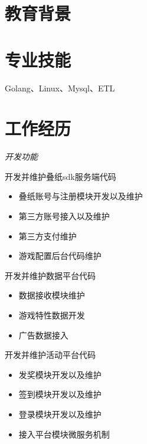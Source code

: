 \documentclass{uniquecv}
\begin{document}

\medskip



\section{教育背景}



\section{专业技能}
\smallskip
Golang、Linux、Mysql、ETL




\section{工作经历}

\textit{开发功能}
\vspace{0.4ex}

开发并维护叠纸sdk服务端代码
\begin{itemize}
  \item 叠纸账号与注册模块开发以及维护
  \item 第三方账号接入以及维护
  \item 第三方支付维护
  \item 游戏配置后台代码维护
\end{itemize}

开发并维护数据平台代码
\begin{itemize}
  \item 数据接收模块维护
  \item 游戏特性数据开发
  \item 广告数据接入
\end{itemize}

开发并维护活动平台代码
\begin{itemize}
  \item 发奖模块开发以及维护
  \item 签到模块开发以及维护
  \item 登录模块开发以及维护
  \item 接入平台模块微服务机制
\end{itemize}
\end{document}
